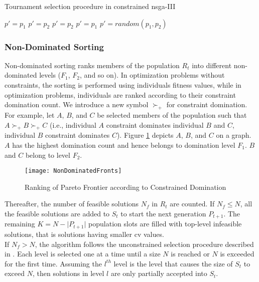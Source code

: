 \begin{algorithm}[h!]
  \caption{Tournament selection procedure in  constrained \gls{nsga}-III}\label{alg:tournament_selection}
    {
        $p' = p_1$
    }
    {
        $p' = p_2$
    }
    {
        {
            $p' = p_2$
        }
        {
            $p' = p_1$
        }
    }
    {
        $p' = random(p_1, p_2)$
    }
    
  \end{algorithm}

\subsubsection{Non-Dominated Sorting} \label{sec:sub:nondominatedsorting}
Non-dominated sorting ranks members of the population $R_t$ into different non-dominated levels ($F_1$, $F_2$, and so on). In optimization problems without constraints, the sorting is performed using individuals fitness values, while in optimization problems, individuals are ranked according to their constraint domination count. We introduce a new symbol $\succ_+$ for constraint domination. For example, let $A$, $B$, and $C$ be selected members of the population  such that $A \succ_+ B \succ_+ C$ (i.e., individual $A$ constraint dominates individual $B$ and $C$, individual $B$ constraint dominates $C$). Figure \ref{fig:paretolevels} depicts $A$, $B$, and $C$ on a graph. $A$ has the highest domination count and hence belongs to domination level $F_1$. $B$ and $C$ belong to level $F_2$. 

\begin{figure}
\centering
\texttt{[image: NonDominatedFronts]}
\caption{Ranking of Pareto Frontier according to Constrained Domination}\label{fig:paretolevels}
\end{figure}

Thereafter, the number of feasible solutions $N_f$ in $R_t$ are counted. If $N_f \leq N$, all the feasible solutions are added to $S_t$ to start the next generation $P_{t+1}$. The remaining $K = N - \lvert P_{t+1} \rvert$ population slots are filled with top-level infeasible solutions, that is solutions having smaller \gls{cv} values.\\
If $N_f > N$, the algorithm follows the unconstrained selection procedure described in \parencite{Deb2013AnConstraints}. Each level is selected one at a time until a size $N$ is reached or $N$ is exceeded for the first time. Assuming the $l^{th}$ level is the level that causes the size of $S_t$ to exceed $N$, then solutions in level $l$ are only partially accepted into $S_t$. 

